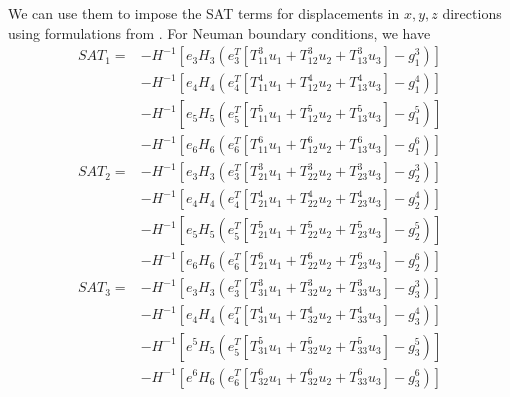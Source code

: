 We can use them to impose the SAT terms for displacements in $x, y, z$ directions using formulations from \cite{ALMQUIST2021109842}.
For Neuman boundary conditions, we have
\begin{align}
    SAT_1 = &-H^{-1} [e_3 H_3 (e_3^T [T_{11}^3 u_1 + T_{12}^3 u_2 + T_{13}^3 u_3] - g_1^3)] \nonumber \\
&- H^{-1} [e_4 H_4 (e_4^T [T_{11}^4 u_1 + T_{12}^4 u_2 + T_{13}^4 u_3] - g_1^4)] \nonumber \\
&- H^{-1} [e_5 H_5 (e_5^T [T_{11}^5 u_1 + T_{12}^5 u_2 + T_{13}^5 u_3] - g_1^5)] \nonumber \\
&- H^{-1} [e_6 H_6 (e_6^T [T_{11}^6 u_1 + T_{12}^6 u_2 + T_{13}^6 u_3] - g_1^6)] \\
SAT_2 = &-H^{-1} [e_3 H_3 (e_3^T [T_{21}^3 u_1 + T_{22}^3 u_2 + T_{23}^3 u_3] - g_2^3)] \nonumber \\
& - H^{-1} [e_4 H_4 (e_4^T [T_{21}^4 u_1 + T_{22}^4 u_2 + T_{23}^4 u_3] - g_2^4)] \nonumber \\
& - H^{-1} [e_5 H_5 (e_5^T [T_{21}^5 u_1 + T_{22}^5 u_2 + T_{23}^5 u_3] - g_2^5)] \nonumber \\
& - H^{-1} [e_6 H_6 (e_6^T [T_{21}^6 u_1 + T_{22}^6 u_2 + T_{23}^6 u_3] - g_2^6)] \\
SAT_3 = &-H^{-1} [e_3 H_3 (e_3^T [T_{31}^3 u_1 + T_{32}^3 u_2 + T_{33}^3 u_3] - g_3^3)] \nonumber\\
& - H^{-1} [e_4 H_4 (e_4^T [T_{31}^4 u_1 + T_{32}^4 u_2 + T_{33}^4 u_3] - g_3^4)] \nonumber\\
& - H^{-1} [e^5 H_5 (e_5^T [T_{31}^5 u_1 + T_{32}^5 u_2 + T_{33}^5 u_3] - g_3^5)] \nonumber\\
& - H^{-1} [e^6 H_6 (e_6^T [T_{32}^6 u_1 + T_{32}^6 u_2 + T_{33}^6 u_3] - g_3^6)]
\label{eqn:neumann-condition}
\end{align}

